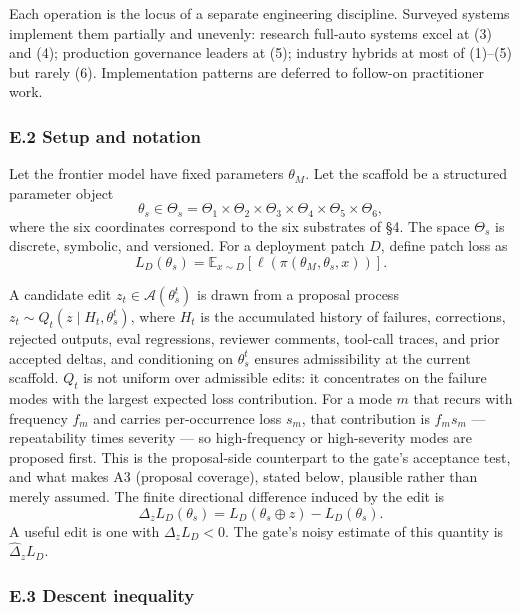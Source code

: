 \documentclass[
]{article}
\begin{document}
Each operation is the locus of a separate engineering discipline.
Surveyed systems implement them partially and unevenly: research
full-auto systems excel at (3) and (4); production governance leaders at
(5); industry hybrids at most of (1)--(5) but rarely (6). Implementation
patterns are deferred to follow-on practitioner work.

\subsubsection{E.2 Setup and notation}\label{e.2-setup-and-notation}

Let the frontier model have fixed parameters \(\theta_M\). Let the
scaffold be a structured parameter object
\[\theta_s \in \Theta_s = \Theta_1 \times \Theta_2 \times \Theta_3 \times \Theta_4 \times \Theta_5 \times \Theta_6,\]
where the six coordinates correspond to the six substrates of §4. The
space \(\Theta_s\) is discrete, symbolic, and versioned. For a
deployment patch \(D\), define patch loss as
\[L_D(\theta_s) = \mathbb{E}_{x \sim D}\!\left[\ell(\pi(\theta_M, \theta_s, x))\right].\]

A candidate edit \(z_t \in \mathcal{A}(\theta_s^t)\) is drawn from a
proposal process \(z_t \sim Q_t(z \mid H_t, \theta_s^t)\), where \(H_t\)
is the accumulated history of failures, corrections, rejected outputs,
eval regressions, reviewer comments, tool-call traces, and prior
accepted deltas, and conditioning on \(\theta_s^t\) ensures
admissibility at the current scaffold. \(Q_t\) is not uniform over
admissible edits: it concentrates on the failure modes with the largest
expected loss contribution. For a mode \(m\) that recurs with frequency
\(f_m\) and carries per-occurrence loss \(s_m\), that contribution is
\(f_m s_m\) --- repeatability times severity --- so high-frequency or
high-severity modes are proposed first. This is the proposal-side
counterpart to the gate's acceptance test, and what makes A3 (proposal
coverage), stated below, plausible rather than merely assumed. The
finite directional difference induced by the edit is
\[\Delta_z L_D(\theta_s) = L_D(\theta_s \oplus z) - L_D(\theta_s).\] A
useful edit is one with \(\Delta_z L_D < 0\). The gate's noisy estimate
of this quantity is \(\widehat{\Delta}_z L_D\).

\subsubsection{E.3 Descent inequality}\label{e.3-descent-inequality}
\end{document}
